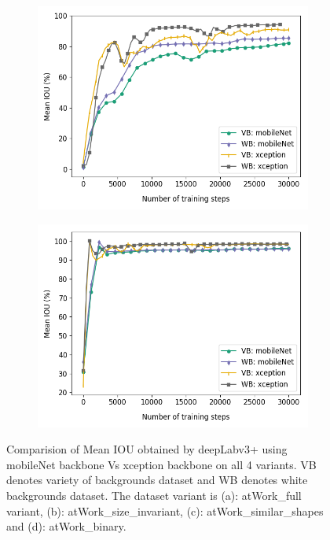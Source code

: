 \begin{figure}
\begin{subfigure}{.5\textwidth}
			\includegraphics[width=1\linewidth]{images/mobxcep_shape}
			\label{4varsc}
			\caption{}
		\end{subfigure}
		\begin{subfigure}{.5\textwidth}
			\centering
			\includegraphics[width=1\linewidth]{images/mobxcep_binary}
			\label{4varsd}
			\caption{}
		\end{subfigure}
		\caption{Comparision of Mean IOU obtained by deepLabv3+ using mobileNet backbone Vs xception backbone on all 4 variants. VB denotes variety of backgrounds dataset and WB denotes white backgrounds dataset. The dataset variant is (a): atWork\_full variant, (b): atWork\_size\_invariant, (c): atWork\_similar\_shapes and (d): atWork\_binary.}
		\label{Fig:4vars}
	\end{figure}

